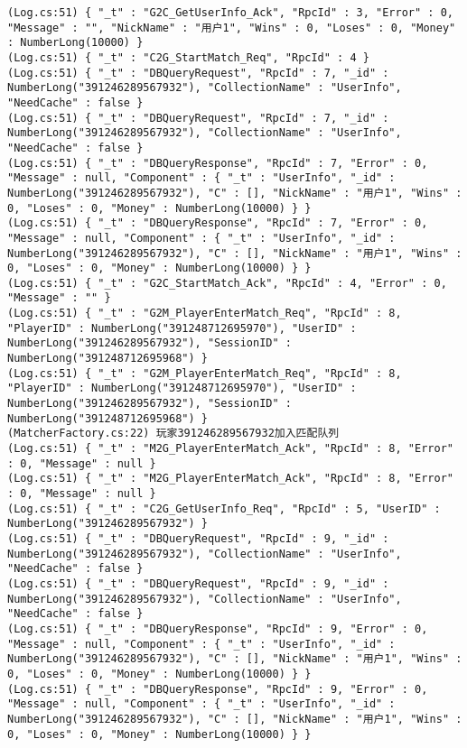 \documentclass[9pt, b5paper]{article}
\begin{document}
\begin{itemize}
\begin{verbatim}
(Log.cs:51) { "_t" : "G2C_GetUserInfo_Ack", "RpcId" : 3, "Error" : 0, "Message" : "", "NickName" : "用户1", "Wins" : 0, "Loses" : 0, "Money" : NumberLong(10000) }
(Log.cs:51) { "_t" : "C2G_StartMatch_Req", "RpcId" : 4 }
(Log.cs:51) { "_t" : "DBQueryRequest", "RpcId" : 7, "_id" : NumberLong("391246289567932"), "CollectionName" : "UserInfo", "NeedCache" : false }
(Log.cs:51) { "_t" : "DBQueryRequest", "RpcId" : 7, "_id" : NumberLong("391246289567932"), "CollectionName" : "UserInfo", "NeedCache" : false }
(Log.cs:51) { "_t" : "DBQueryResponse", "RpcId" : 7, "Error" : 0, "Message" : null, "Component" : { "_t" : "UserInfo", "_id" : NumberLong("391246289567932"), "C" : [], "NickName" : "用户1", "Wins" : 0, "Loses" : 0, "Money" : NumberLong(10000) } }
(Log.cs:51) { "_t" : "DBQueryResponse", "RpcId" : 7, "Error" : 0, "Message" : null, "Component" : { "_t" : "UserInfo", "_id" : NumberLong("391246289567932"), "C" : [], "NickName" : "用户1", "Wins" : 0, "Loses" : 0, "Money" : NumberLong(10000) } }
(Log.cs:51) { "_t" : "G2C_StartMatch_Ack", "RpcId" : 4, "Error" : 0, "Message" : "" }
(Log.cs:51) { "_t" : "G2M_PlayerEnterMatch_Req", "RpcId" : 8, "PlayerID" : NumberLong("391248712695970"), "UserID" : NumberLong("391246289567932"), "SessionID" : NumberLong("391248712695968") }
(Log.cs:51) { "_t" : "G2M_PlayerEnterMatch_Req", "RpcId" : 8, "PlayerID" : NumberLong("391248712695970"), "UserID" : NumberLong("391246289567932"), "SessionID" : NumberLong("391248712695968") }
(MatcherFactory.cs:22) 玩家391246289567932加入匹配队列
(Log.cs:51) { "_t" : "M2G_PlayerEnterMatch_Ack", "RpcId" : 8, "Error" : 0, "Message" : null }
(Log.cs:51) { "_t" : "M2G_PlayerEnterMatch_Ack", "RpcId" : 8, "Error" : 0, "Message" : null }
(Log.cs:51) { "_t" : "C2G_GetUserInfo_Req", "RpcId" : 5, "UserID" : NumberLong("391246289567932") }
(Log.cs:51) { "_t" : "DBQueryRequest", "RpcId" : 9, "_id" : NumberLong("391246289567932"), "CollectionName" : "UserInfo", "NeedCache" : false }
(Log.cs:51) { "_t" : "DBQueryRequest", "RpcId" : 9, "_id" : NumberLong("391246289567932"), "CollectionName" : "UserInfo", "NeedCache" : false }
(Log.cs:51) { "_t" : "DBQueryResponse", "RpcId" : 9, "Error" : 0, "Message" : null, "Component" : { "_t" : "UserInfo", "_id" : NumberLong("391246289567932"), "C" : [], "NickName" : "用户1", "Wins" : 0, "Loses" : 0, "Money" : NumberLong(10000) } }
(Log.cs:51) { "_t" : "DBQueryResponse", "RpcId" : 9, "Error" : 0, "Message" : null, "Component" : { "_t" : "UserInfo", "_id" : NumberLong("391246289567932"), "C" : [], "NickName" : "用户1", "Wins" : 0, "Loses" : 0, "Money" : NumberLong(10000) } }

\end{verbatim}
\end{itemize}
\end{document}
